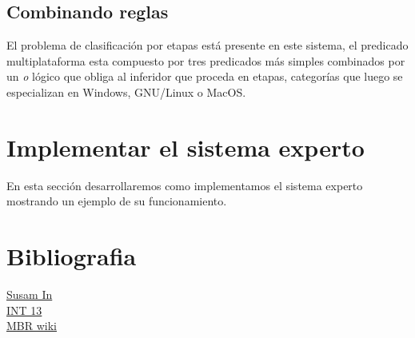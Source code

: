 \documentclass[11pt,oneside,a4paper]{article}
\begin{document}
\subsection{Combinando reglas} %

El problema de clasificación por etapas está presente en este sistema, el predicado 
multiplataforma esta compuesto por tres predicados más simples
combinados por un \emph{o} lógico que obliga al inferidor que proceda en etapas, 
categorías que luego se especializan en Windows, GNU/Linux o MacOS. 


\section{Implementar el sistema experto}

En esta sección desarrollaremos como implementamos el sistema experto mostrando un ejemplo
de su funcionamiento.


\section*{Bibliografia}


\href{http://susam.in/articles/boot-sector-code/}{Susam In}\\
\href{http://www.pelletiernet.com/helppc/int_13-2.html}{INT 13}\\
\href{http://en.wikipedia.org/wiki/Master_boot_record}{MBR wiki}
\end{document}

